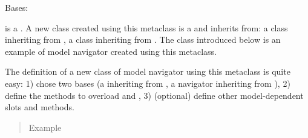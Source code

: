\documentclass[letterpaper,10pt,english]{sphinxmanual}
\begin{document}
\begin{fulllineitems}
\label{\detokenize{index:MetaModelNavigator.MetaModelNavigator}}
Bases: 

{\hyperref[\detokenize{index:MetaModelNavigator.MetaModelNavigator}]{}} is a . 
A new class created using this metaclass is a  and inherits from: 
 a class inheriting from {\hyperref[\detokenize{index:Model.Model}]{}},  a class inheriting from {\hyperref[\detokenize{index:Navigator.Navigator}]{}}. 
The class  introduced below is an example of model navigator created using this metaclass.

The definition of a new class of model navigator using this metaclass is quite easy: 
1) chose two bases (a  inheriting from {\hyperref[\detokenize{index:Model.Model}]{}}, a navigator inheriting from {\hyperref[\detokenize{index:Navigator.Navigator}]{}}), 
2) define the methods to overload  and ,
3) (optional) define other model-dependent slots and methods.
\begin{quote}\begin{description}
\item[{Example}] \leavevmode
\end{description}\end{quote}


\end{fulllineitems}
\end{document}
